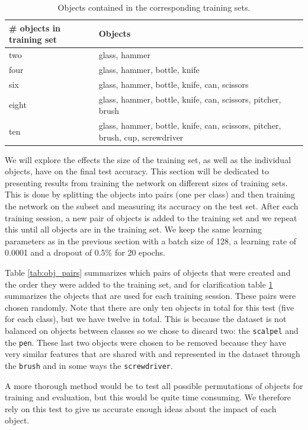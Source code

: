 \begin{table}
	\centering
	\begin{tabular}{l | p{8cm}}
		\hline
		\# objects in training set & Objects \\ \hline
		two   & glass, hammer \\
		four  & glass, hammer, bottle, knife \\
		six   & glass, hammer, bottle, knife, can, scissors \\
		eight & glass, hammer, bottle, knife, can, scissors, pitcher, brush \\
		ten   & glass, hammer, bottle, knife, can, scissors, pitcher, brush, cup, screwdriver \\
		\hline
	\end{tabular}
	\caption{Objects contained in the corresponding training sets.}
	\label{tab:obj_training_sets}
\end{table}

We will explore the effects the size of the training set, as well as the individual objects, have on the final test accuracy. This section will be dedicated to presenting results from training the network on different sizes of training sets. This is done by splitting the objects into pairs (one per class) and then training the network on the subset and measuring its accuracy on the test set. After each training session, a new pair of objects is added to the training set and we repeat this until all objects are in the training set. We keep the same learning parameters as in the previous section with a batch size of 128, a learning rate of 0.0001 and a dropout of 0.5\% for 20 epochs.

Table \ref{tab:obj_pairs} summarizes which pairs of objects that were created and the order they were added to the training set, and for clarification table \ref{tab:obj_training_sets} summarizes the objects that are used for each training session. These pairs were chosen randomly. Note that there are only ten objects in total for this test (five for each class), but we have twelve in total. This is because the dataset is not balanced on objects between classes so we chose to discard two: the \texttt{scalpel} and the \texttt{pen}. These last two objects were chosen to be removed because they have very similar features that are shared with and represented in the dataset through the \texttt{brush} and in some ways the \texttt{screwdriver}.

A more thorough method would be to test all possible permutations of objects for training and evaluation, but this would be quite time consuming. We therefore rely on this test to give us accurate enough ideas about the impact of each object.


